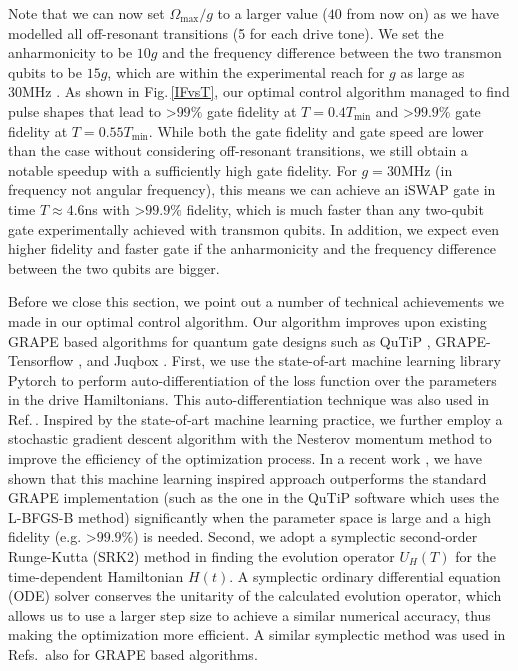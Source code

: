 \documentclass[twocolumn,english,pra,superscriptaddress]{revtex4-1}
\begin{document}
Note that we can now set $\Omega_{\text{max}}/g$ to a larger value ($40$ from now on) as we have modelled all off-resonant transitions (5 for each drive tone). We set the anharmonicity to be $10g$ and the frequency difference between the two transmon qubits to be $15g$, which are  within the experimental reach for $g$ as large as 30MHz \cite{Joel,RayParam}. As shown in Fig.\,\ref{IFvsT}, our optimal control algorithm managed to find pulse shapes that lead to \textgreater $99\%$ gate fidelity at $T=0.4T_{\text{min}}$ and \textgreater $99.9\%$ gate fidelity at $T=0.55T_{\text{min}}$. While both the gate fidelity and gate speed are lower than the case without considering off-resonant transitions, we still obtain a notable speedup with a sufficiently high gate fidelity. For $g=30$MHz (in frequency not angular frequency), this means we can achieve an iSWAP gate in time $T\approx 4.6$ns with \textgreater $99.9\%$ fidelity, which is much faster than any two-qubit gate experimentally achieved with transmon qubits. In addition, we expect even higher fidelity and faster gate if the anharmonicity and the frequency difference between the two qubits are bigger.


Before we close this section, we point out a number of technical achievements we made in our optimal control algorithm. Our algorithm improves upon existing GRAPE based algorithms for quantum gate designs such as QuTiP \cite{qutip}, GRAPE-Tensorflow \cite{Schuster1}, and Juqbox \cite{LLNL1}. First, we use the state-of-art machine learning library Pytorch to perform auto-differentiation of the loss function over the parameters in the drive Hamiltonians. This auto-differentiation technique was also used in Ref.\,\cite{Schuster1}. Inspired by the state-of-art machine learning practice, we further employ a stochastic gradient descent algorithm with the Nesterov momentum method \cite{momentum} to improve the efficiency of the optimization process. In a recent work \cite{Joel}, we have shown that this machine learning inspired approach outperforms the standard GRAPE implementation (such as the one in the QuTiP software \cite{qutip} which uses the L-BFGS-B method) significantly when the parameter space is large and a high fidelity (e.g. \textgreater$99.9\%$) is needed. Second, we adopt a symplectic second-order Runge-Kutta (SRK2) method \cite{Feng2010} in finding the evolution operator $U_H(T)$ for the time-dependent Hamiltonian $H(t)$. A symplectic ordinary differential equation (ODE) solver conserves the unitarity of the calculated evolution operator, which allows us to use a larger step size to achieve a similar numerical accuracy, thus making the optimization more efficient. A similar symplectic method was used in Refs.\,\cite{LLNL1,LLNL2} also for GRAPE based algorithms.
\end{document}
